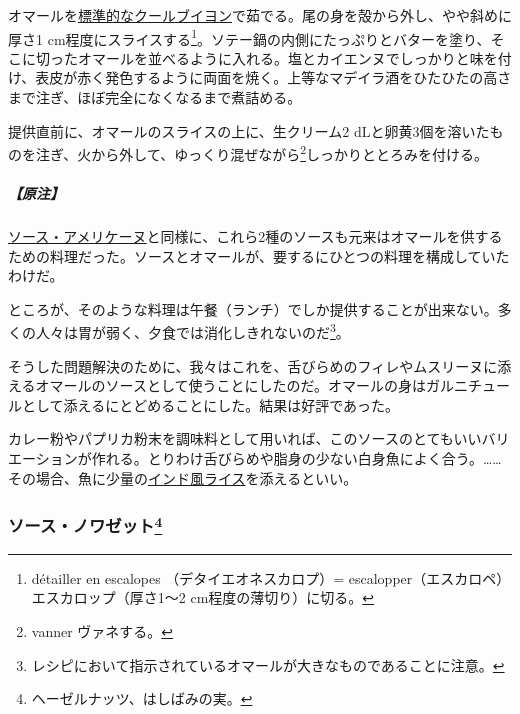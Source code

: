 \begin{recette}

オマールを\protect\hyperlink{court-bouillon-e}{標準的なクールブイヨン}で茹でる。尾の身を殻から外し、やや斜めに厚さ1
cm程度にスライスする\footnote{détailler en escalopes
  （デタイエオネスカロプ）= escalopper（エスカロペ）
  エスカロップ（厚さ1〜2 cm程度の薄切り）に切る。}。ソテー鍋の内側にたっぷりとバターを塗り、そこに切ったオマールを並べるように入れる。塩とカイエンヌでしっかりと味を付け、表皮が赤く発色するように両面を焼く。上等なマデイラ酒をひたひたの高さまで注ぎ、ほぼ完全になくなるまで煮詰める。

提供直前に、オマールのスライスの上に、生クリーム2
dLと卵黄3個を溶いたものを注ぎ、火から外して、ゆっくり混ぜながら\footnote{vanner
  ヴァネする。}しっかりととろみを付ける。

\hypertarget{nota-sauce-new-burg-b}{%
\subparagraph{【原注】}\label{nota-sauce-new-burg-b}}

\protect\hyperlink{sauce-americaine}{ソース・アメリケーヌ}と同様に、これら2種のソースも元来はオマールを供するための料理だった。ソースとオマールが、要するにひとつの料理を構成していたわけだ。

ところが、そのような料理は午餐（ランチ）でしか提供することが出来ない。多くの人々は胃が弱く、夕食では消化しきれないのだ\footnote{レシピにおいて指示されているオマールが大きなものであることに注意。}。

そうした問題解決のために、我々はこれを、舌びらめのフィレやムスリーヌに添えるオマールのソースとして使うことにしたのだ。オマールの身はガルニチュールとして添えるにとどめることにした。結果は好評であった。

カレー粉やパプリカ粉末を調味料として用いれば、このソースのとてもいいバリエーションが作れる。とりわけ舌びらめや脂身の少ない白身魚によく合う。\ldots{}\ldots{}その場合、魚に少量の\protect\hyperlink{riz-indienne}{インド風ライス}を添えるといい。

\hypertarget{sauce-noisette}{%
\subsubsection[ソース・ノワゼット]{\texorpdfstring{ソース・ノワゼット\footnote{ヘーゼルナッツ、はしばみの実。}}{ソース・ノワゼット}}\label{sauce-noisette}}


\end{recette}
